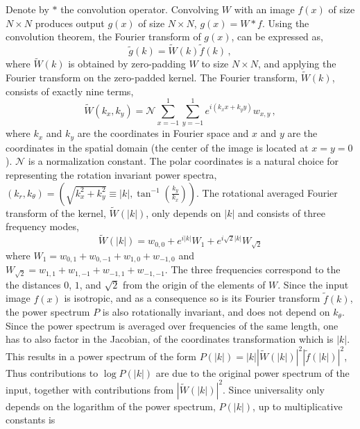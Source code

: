 \documentclass{article}
\begin{document}
Denote by $*$ the convolution operator.  Convolving $W$ with an image $f\left( x \right)$ of size $N\times N$ produces output $g \left(x \right)$ of size $N \times N$, $g\left(x\right) = W * f$.  Using the convolution theorem, the Fourier transform of $g\left(x\right)$,  can be expressed as,
\begin{equation}
    \tilde g \left( k \right)  = \tilde W\left( k \right)  \tilde f \left( k \right) \,,
    \label{eq:convolvefourier}
\end{equation}
where $\tilde W\left( k \right)$ is obtained by zero-padding $W$ to size $N\times N$, and applying the Fourier transform on the zero-padded kernel. The Fourier transform, $\tilde W\left(k\right)$, consists of exactly nine terms,
\begin{equation}
    \tilde W \left( k_x,k_y \right) = \mathcal{N}\sum_{x=-1}^1 \sum_{y=-1}^1 e^{i \left( k_x x + k_y y \right)}w_{x,y} \,,
    \label{eq:fourierW}
\end{equation}
where $k_x$ and $k_y$ are the coordinates in Fourier space and $x$ and $y$ are the coordinates in the spatial domain (the center of the image is located at $x=y=0$). $\mathcal{N}$ is a normalization constant. The polar coordinates is a natural choice for representing the rotation invariant power spectra, $\left(k_r,k_\theta\right) = \left(\sqrt{k_x^2 + k_y^2} \equiv \vert k \vert,  \tan^{-1}\left(\frac{k_y}{k_x}\right)\right)$.
The rotational averaged Fourier transform of the kernel,  $\tilde W \left( \vert k \vert \right)$, only depends on $\vert k \vert$ and consists of three frequency modes, 
\begin{equation}
    \tilde W \left( \vert k \vert \right)= w_{0,0} + e^{i\vert k \vert}W_1 +  e^{i\sqrt{2}\vert k \vert}W_{\sqrt{2}}
\end{equation}
where $W_1 = w_{0,1}+w_{0,-1}+w_{1,0}+w_{-1,0}$ and $W_{\sqrt{2}} = w_{1,1}+w_{1,-1}+w_{-1,1}+w_{-1,-1}$. The three frequencies correspond to the the distances $0$, $1$, and $\sqrt{2}$ from the origin of the elements of $W$. Since the input image $f\left(x\right)$ is isotropic, and as a consequence so is its Fourier transform $\tilde f\left( k\right)$, the power spectrum $P$  is also rotationally invariant, and does not depend on $k_\theta$. Since the power spectrum is averaged over frequencies of the same length, one has to also factor in the Jacobian, of the coordinates transformation which is $\vert k \vert$. This results in a power spectrum of the form $    P\left( \vert k \vert \right) = \vert k \vert \left \vert \tilde W \left( \vert k \vert \right) \right \vert^2 \left \vert \tilde f \left( \vert k \vert \right) \right \vert^2$, Thus contributions to  $\log P\left( \vert k \vert \right)$ are due to the original power spectrum of the input, together with contributions from $\left \vert \tilde W \left( \vert k \vert \right) \right \vert^2$. Since universality only depends on the logarithm of the power spectrum, $P\left( \vert k \vert \right)$, up to multiplicative constants is
\end{document}

